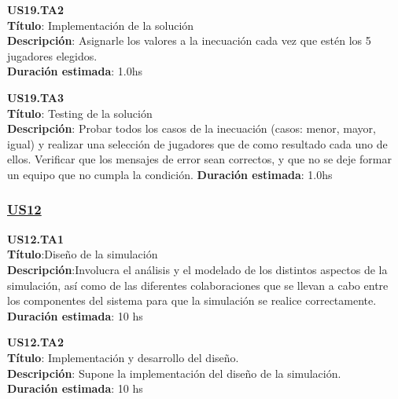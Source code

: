 \begin{tcolorbox}
\textbf{US19.TA2} \\
\textbf{Título}: Implementación de la solución \\
\textbf{Descripción}: Asignarle los valores a la inecuación cada vez que estén los 5 jugadores elegidos. \\
\textbf{Duración estimada}: 1.0hs
\end{tcolorbox}
\vspace{10pt}

\begin{tcolorbox}
\textbf{US19.TA3} \\
\textbf{Título}: Testing de la solución \\
\textbf{Descripción}: Probar todos los casos de la inecuación (casos: menor, mayor, igual) y realizar una selección de jugadores que de como resultado cada uno de ellos. Verificar que los mensajes de error sean correctos, y que no se deje formar un equipo que no cumpla la condición.
\textbf{Duración estimada}: 1.0hs
\end{tcolorbox}
\vspace{10pt}


\subsubsection*{\underline{US12}}

\begin{tcolorbox}
\textbf{US12.TA1} \\
\textbf{Título}:Diseño de la simulación\\
\textbf{Descripción}:Involucra el análisis y el modelado de los distintos aspectos de la simulación, así como de las diferentes colaboraciones que se llevan a cabo entre los componentes del sistema para que la simulación se realice correctamente.\\
\textbf{Duración estimada}: 10 hs
\end{tcolorbox}
\vspace{10pt}

\begin{tcolorbox}
\textbf{US12.TA2} \\
\textbf{Título}: Implementación y desarrollo del diseño.\\
\textbf{Descripción}: Supone la implementación del diseño de la simulación.\\
\textbf{Duración estimada}: 10 hs
\end{tcolorbox}
\vspace{10pt}

